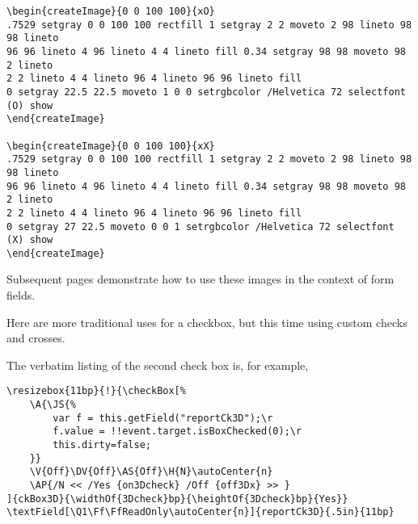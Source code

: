 \documentclass{article}
\begin{document}
\begin{scriptsize}
\begin{verbatim}
\begin{createImage}{0 0 100 100}{xO}
.7529 setgray 0 0 100 100 rectfill 1 setgray 2 2 moveto 2 98 lineto 98 98 lineto
96 96 lineto 4 96 lineto 4 4 lineto fill 0.34 setgray 98 98 moveto 98 2 lineto
2 2 lineto 4 4 lineto 96 4 lineto 96 96 lineto fill
0 setgray 22.5 22.5 moveto 1 0 0 setrgbcolor /Helvetica 72 selectfont (O) show
\end{createImage}

\begin{createImage}{0 0 100 100}{xX}
.7529 setgray 0 0 100 100 rectfill 1 setgray 2 2 moveto 2 98 lineto 98 98 lineto
96 96 lineto 4 96 lineto 4 4 lineto fill 0.34 setgray 98 98 moveto 98 2 lineto
2 2 lineto 4 4 lineto 96 4 lineto 96 96 lineto fill
0 setgray 27 22.5 moveto 0 0 1 setrgbcolor /Helvetica 72 selectfont (X) show
\end{createImage}
\end{verbatim}
\end{scriptsize}

Subsequent pages demonstrate how to use these images in the context of form fields.



Here are more traditional uses for a checkbox, but this time using
custom checks and crosses.

\medskip
\noindent\hspace*{20pt}

\smallskip
\noindent\hspace*{20pt}

\medskip The verbatim listing of the second check box is, for example,
\begin{small}
\begin{verbatim}
\resizebox{11bp}{!}{\checkBox[%
    \A{\JS{%
        var f = this.getField("reportCk3D");\r
        f.value = !!event.target.isBoxChecked(0);\r
        this.dirty=false;
    }}
    \V{Off}\DV{Off}\AS{Off}\H{N}\autoCenter{n}
    \AP{/N << /Yes {on3Dcheck} /Off {off3Dx} >> }
]{ckBox3D}{\widthOf{3Dcheck}bp}{\heightOf{3Dcheck}bp}{Yes}}
\textField[\Q1\Ff\FfReadOnly\autoCenter{n}]{reportCk3D}{.5in}{11bp}
\end{verbatim}
\end{small}
\end{document}
